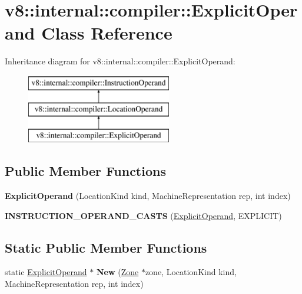 \hypertarget{classv8_1_1internal_1_1compiler_1_1_explicit_operand}{}\section{v8\+:\+:internal\+:\+:compiler\+:\+:Explicit\+Operand Class Reference}
\label{classv8_1_1internal_1_1compiler_1_1_explicit_operand}
Inheritance diagram for v8\+:\+:internal\+:\+:compiler\+:\+:Explicit\+Operand\+:\begin{figure}[H]
\begin{center}
\leavevmode
\includegraphics[height=3.000000cm]{classv8_1_1internal_1_1compiler_1_1_explicit_operand}
\end{center}
\end{figure}
\subsection*{Public Member Functions}
\begin{DoxyCompactItemize}
\item 
{\bfseries Explicit\+Operand} (Location\+Kind kind, Machine\+Representation rep, int index)\hypertarget{classv8_1_1internal_1_1compiler_1_1_explicit_operand_a43392873c60a1a7d726b64c0498f56af}{}\label{classv8_1_1internal_1_1compiler_1_1_explicit_operand_a43392873c60a1a7d726b64c0498f56af}

\item 
{\bfseries I\+N\+S\+T\+R\+U\+C\+T\+I\+O\+N\+\_\+\+O\+P\+E\+R\+A\+N\+D\+\_\+\+C\+A\+S\+TS} (\hyperlink{classv8_1_1internal_1_1compiler_1_1_explicit_operand}{Explicit\+Operand}, E\+X\+P\+L\+I\+C\+IT)\hypertarget{classv8_1_1internal_1_1compiler_1_1_explicit_operand_ab430128e8c48d4fdec57b4da34626529}{}\label{classv8_1_1internal_1_1compiler_1_1_explicit_operand_ab430128e8c48d4fdec57b4da34626529}

\end{DoxyCompactItemize}
\subsection*{Static Public Member Functions}
\begin{DoxyCompactItemize}
\item 
static \hyperlink{classv8_1_1internal_1_1compiler_1_1_explicit_operand}{Explicit\+Operand} $\ast$ {\bfseries New} (\hyperlink{classv8_1_1internal_1_1_zone}{Zone} $\ast$zone, Location\+Kind kind, Machine\+Representation rep, int index)\hypertarget{classv8_1_1internal_1_1compiler_1_1_explicit_operand_aba19707a3d67b7f3debc43e22eac4fe8}{}\label{classv8_1_1internal_1_1compiler_1_1_explicit_operand_aba19707a3d67b7f3debc43e22eac4fe8}

\end{DoxyCompactItemize}
